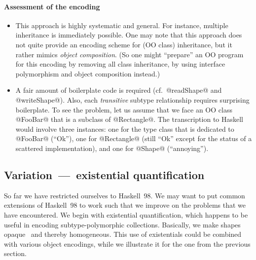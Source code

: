 \documentclass{jfp}
\begin{document}
\paragraph{Assessment of the encoding}

\mbox{}

\begin{itemize}

\item 
This approach is highly systematic and general. For instance, multiple
inheritance is immediately possible. One may note that this approach
does not quite provide an encoding scheme for (OO class) inheritance,
but it rather mimics \emph{object composition}. (So one might
``prepare'' an OO program for this encoding by removing all class
inheritance, by using interface polymorphism and object composition
instead.)

\smallskip

\item 
A fair amount of boilerplate code is required (cf.\ @readShape@ and
@writeShape@).  Also, each \emph{transitive} subtype relationship
requires surprising boilerplate. To see the problem, let us assume
that we face an OO class @FooBar@ that is a subclass of
@Rectangle@. The transcription to Haskell would involve three
instances: one for the type class that is dedicated to @FooBar@
(``Ok''), one for @Rectangle@ (still ``Ok'' except for the status of a
scattered implementation), and one for @Shape@ (``annoying'').

\end{itemize}






\subsection{Variation~---~existential quantification}
\label{S:exists}

So far we have restricted ourselves to Haskell~98. We may want to put
common extensions of Haskell~98 to work such that we improve on the
problems that we have encountered. We begin with existential
quantification, which happens to be useful in encoding
subtype-polymorphic collections. Basically, we make shapes
opaque~\cite{CW85} and thereby homogeneous. This use of existentials
could be combined with various object encodings, while we illustrate
it for the one from the previous section.
\end{document}
